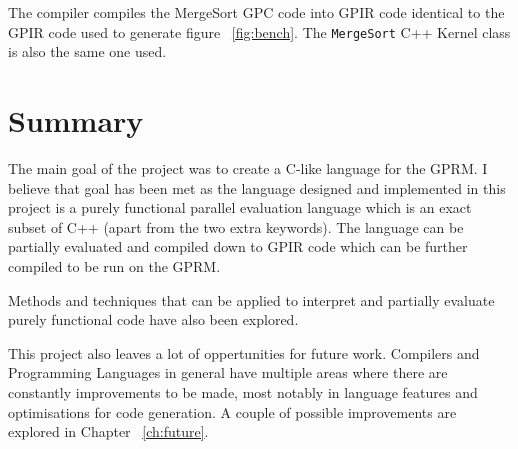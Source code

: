 The compiler compiles the MergeSort GPC code into GPIR code identical to the GPIR code used to generate figure ~\ref{fig:bench}.
The \texttt{MergeSort} C++ Kernel class is also the same one used.

\section{Summary}
The main goal of the project was to create a C-like language for the GPRM.
I believe that goal has been met as the language designed and implemented 
in this project is a purely functional parallel evaluation language which is an exact subset of C++ 
(apart from the two extra keywords). The language can be partially evaluated and compiled down to GPIR code 
which can be further compiled to be run on the GPRM. 

Methods and techniques that can be applied to interpret and partially evaluate purely
functional code have also been explored.

This project also leaves a lot of oppertunities for future work. Compilers and Programming Languages in general have
multiple areas where there are constantly improvements to be made, most notably in language features and optimisations 
for code generation. A couple of possible improvements are explored in Chapter ~\ref{ch:future}.





